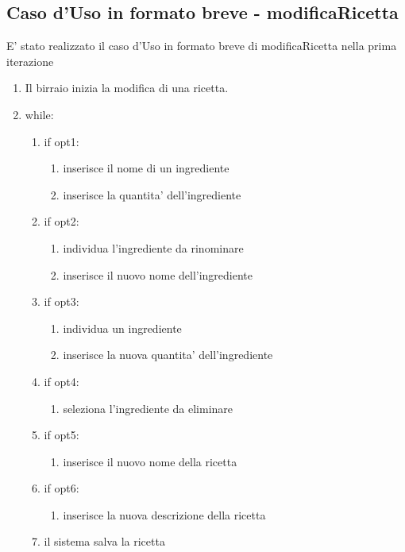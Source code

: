 \documentclass[a4paper,12pt]{report}
\begin{document}
		\subsection{Caso d'Uso in formato breve - modificaRicetta}		
			E' stato realizzato il caso d'Uso in formato breve di modificaRicetta nella prima iterazione
			\begin{enumerate}
    				\item Il birraio inizia la modifica di una ricetta.
    				\item while:
				\begin{enumerate}
					\item  if opt1:
						\begin{enumerate}
							\item inserisce il nome di un ingrediente
							\item inserisce la quantita' dell'ingrediente
						\end{enumerate}		
					\item  if opt2:
						\begin{enumerate}
							\item individua l'ingrediente da rinominare
							\item inserisce il nuovo nome dell'ingrediente
						\end{enumerate}		
					\item  if opt3:
						\begin{enumerate}
							\item individua un ingrediente
							\item inserisce la nuova quantita' dell'ingrediente
						\end{enumerate}
 					\item  if opt4:
						\begin{enumerate}
  							\item seleziona l'ingrediente da eliminare
						\end{enumerate}	
 					\item  if opt5:
						\begin{enumerate}
  							\item inserisce il nuovo nome della ricetta
						\end{enumerate}
 					\item  if opt6:
						\begin{enumerate}
  							\item inserisce la nuova descrizione della ricetta
						\end{enumerate}	
    					\item il sistema salva la ricetta
				\end{enumerate}	
			\end{enumerate}
			
\end{document}

